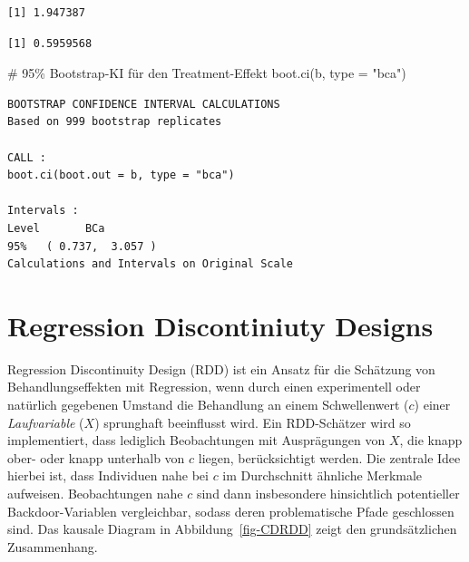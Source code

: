 \documentclass[
  a4paper,
  DIV=11,
  oneside]{scrreprt}
\newenvironment{Shaded}{\begin{snugshade}}{\end{snugshade}}
\newcommand{\AttributeTok}[1]{\textcolor[rgb]{0.40,0.45,0.13}{#1}}
\newcommand{\CommentTok}[1]{\textcolor[rgb]{0.37,0.37,0.37}{#1}}
\newcommand{\FunctionTok}[1]{\textcolor[rgb]{0.28,0.35,0.67}{#1}}
\newcommand{\NormalTok}[1]{\textcolor[rgb]{0.00,0.23,0.31}{#1}}
\newcommand{\SpecialCharTok}[1]{\textcolor[rgb]{0.37,0.37,0.37}{#1}}
\newcommand{\StringTok}[1]{\textcolor[rgb]{0.13,0.47,0.30}{#1}}
\begin{document}
\begin{verbatim}
[1] 1.947387
\end{verbatim}

\begin{Shaded}
\end{Shaded}

\begin{verbatim}
[1] 0.5959568
\end{verbatim}

\begin{Shaded}
\begin{Highlighting}[]
\CommentTok{\# 95\% Bootstrap{-}KI für den Treatment{-}Effekt}
\FunctionTok{boot.ci}\NormalTok{(b, }\AttributeTok{type =} \StringTok{"bca"}\NormalTok{)}
\end{Highlighting}
\end{Shaded}

\begin{verbatim}
BOOTSTRAP CONFIDENCE INTERVAL CALCULATIONS
Based on 999 bootstrap replicates

CALL : 
boot.ci(boot.out = b, type = "bca")

Intervals : 
Level       BCa          
95%   ( 0.737,  3.057 )  
Calculations and Intervals on Original Scale
\end{verbatim}


\hypertarget{regression-discontiniuty-designs}{%
\chapter{Regression Discontiniuty
Designs}\label{regression-discontiniuty-designs}}

Regression Discontinuity Design (RDD) ist ein Ansatz für die Schätzung
von Behandlungseffekten mit Regression, wenn durch einen experimentell
oder natürlich gegebenen Umstand die Behandlung an einem Schwellenwert
(\(c\)) einer \emph{Laufvariable} (\(X\)) sprunghaft beeinflusst wird.
Ein RDD-Schätzer wird so implementiert, dass lediglich Beobachtungen mit
Ausprägungen von \(X\), die knapp ober- oder knapp unterhalb von \(c\)
liegen, berücksichtigt werden. Die zentrale Idee hierbei ist, dass
Individuen nahe bei \(c\) im Durchschnitt ähnliche Merkmale aufweisen.
Beobachtungen nahe \(c\) sind dann insbesondere hinsichtlich
potentieller Backdoor-Variablen vergleichbar, sodass deren
problematische Pfade geschlossen sind. Das kausale Diagram in
Abbildung~\ref{fig-CDRDD} zeigt den grundsätzlichen Zusammenhang.
\end{document}
